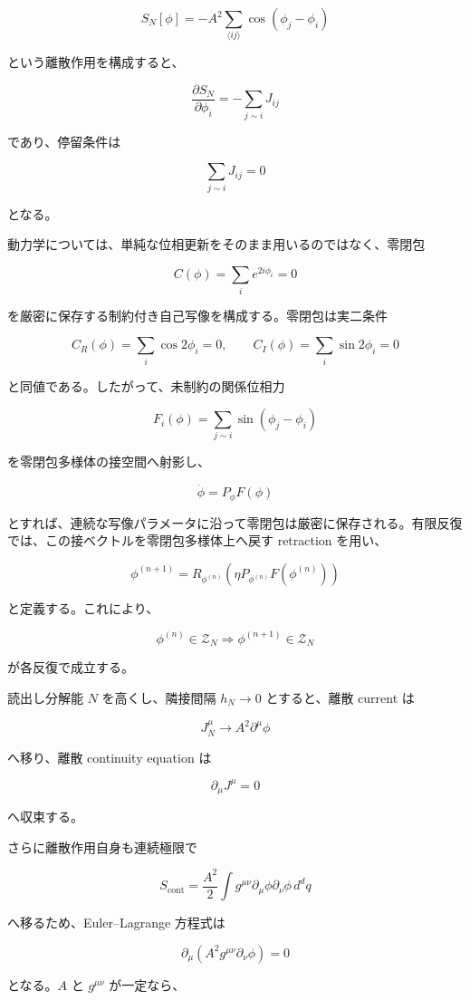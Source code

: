 \documentclass[
  a4paper,
]{ltjsarticle}
\begin{document}
\[
S_N[\phi]
=
-A^2\sum_{\langle ij\rangle}
\cos(\phi_j-\phi_i)
\]

という離散作用を構成すると、

\[
\frac{\partial S_N}{\partial\phi_i}
=
-\sum_{j\sim i}J_{ij}
\]

であり、停留条件は

\[
\sum_{j\sim i}J_{ij}=0
\]

となる。

動力学については、単純な位相更新をそのまま用いるのではなく、零閉包

\[
C(\phi)
=
\sum_i e^{2i\phi_i}
=
0
\]

を厳密に保存する制約付き自己写像を構成する。零閉包は実二条件

\[
C_R(\phi)=\sum_i\cos2\phi_i=0,
\qquad
C_I(\phi)=\sum_i\sin2\phi_i=0
\]

と同値である。したがって、未制約の関係位相力

\[
F_i(\phi)
=
\sum_{j\sim i}\sin(\phi_j-\phi_i)
\]

を零閉包多様体の接空間へ射影し、

\[
\dot\phi
=
P_\phi F(\phi)
\]

とすれば、連続な写像パラメータに沿って零閉包は厳密に保存される。有限反復では、この接ベクトルを零閉包多様体上へ戻す
retraction を用い、

\[
\boxed{
\phi^{(n+1)}
=
R_{\phi^{(n)}}
\!\left(
\eta P_{\phi^{(n)}}F(\phi^{(n)})
\right)
}
\]

と定義する。これにより、

\[
\phi^{(n)}\in\mathcal Z_N
\Longrightarrow
\phi^{(n+1)}\in\mathcal Z_N
\]

が各反復で成立する。

読出し分解能 \(N\) を高くし、隣接間隔 \(h_N\to0\) とすると、離散 current
は

\[
J_N^\mu
\longrightarrow
A^2\partial^\mu\phi
\]

へ移り、離散 continuity equation は

\[
\boxed{
\partial_\mu J^\mu=0
}
\]

へ収束する。

さらに離散作用自身も連続極限で

\[
S_{\mathrm{cont}}
=
\frac{A^2}{2}
\int
g^{\mu\nu}
\partial_\mu\phi
\partial_\nu\phi
\,d^dq
\]

へ移るため、Euler--Lagrange 方程式は

\[
\boxed{
\partial_\mu
\left(
A^2g^{\mu\nu}\partial_\nu\phi
\right)
=
0
}
\]

となる。\(A\) と \(g^{\mu\nu}\) が一定なら、
\end{document}

